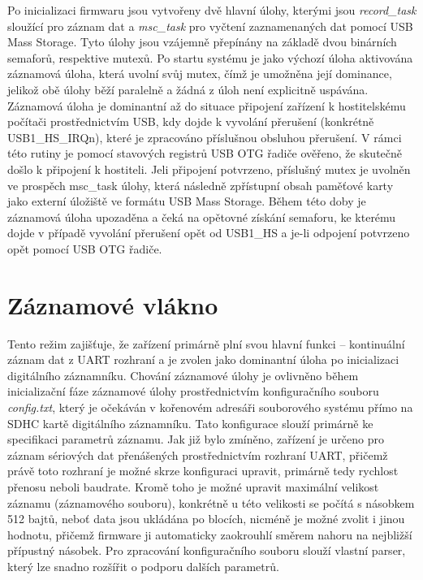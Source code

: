 Po inicializaci firmwaru jsou vytvořeny dvě hlavní úlohy, kterými jsou \textit{record\_task} sloužící pro záznam dat  a \textit{msc\_task} pro vyčtení zaznamenaných dat pomocí USB Mass Storage. Tyto úlohy jsou vzájemně přepínány na základě dvou binárních semaforů, respektive mutexů. Po startu systému je jako výchozí úloha aktivována záznamová úloha, která uvolní svůj mutex, čímž je umožněna její dominance, jelikož obě úlohy běží paralelně a žádná z úloh není explicitně uspávána. Záznamová úloha je dominantní až do situace připojení zařízení k hostitelskému počítači prostřednictvím USB, kdy dojde k vyvolání přerušení (konkrétně USB1\_HS\_IRQn), které je zpracováno příslušnou obsluhou přerušení. V rámci této rutiny je pomocí stavových registrů USB OTG řadiče ověřeno, že skutečně došlo k připojení k hostiteli. Jeli připojení potvrzeno, příslušný mutex je uvolněn ve prospěch msc\_task úlohy, která následně zpřístupní obsah paměťové karty jako externí úložiště ve formátu USB Mass Storage. Během této doby je záznamová úloha upozaděna a čeká na opětovné získání semaforu, ke kterému dojde v případě vyvolání přerušení opět od USB1\_HS a je-li odpojení potvrzeno opět pomocí USB OTG řadiče. 

\newpage

\section{Záznamové vlákno}
Tento režim zajišťuje, že zařízení primárně plní svou hlavní funkci – kontinuální záznam dat z UART rozhraní a je zvolen jako dominantní úloha po inicializaci digitálního záznamníku. Chování záznamové úlohy je ovlivněno během inicializační fáze záznamové úlohy prostřednictvím konfiguračního souboru \textit{config.txt}, který je očekáván v kořenovém adresáři souborového systému přímo na SDHC kartě digitálního záznamníku. Tato konfigurace slouží primárně ke specifikaci parametrů záznamu. Jak již bylo zmíněno, zařízení je určeno pro záznam sériových dat přenášených prostřednictvím rozhraní UART, přičemž právě toto rozhraní je možné skrze konfiguraci upravit, primárně tedy rychlost přenosu neboli baudrate. Kromě toho je možné upravit maximální velikost záznamu (záznamového souboru), konkrétně u této velikosti se počítá s násobkem 512 bajtů, neboť data jsou ukládána po blocích, nicméně je možné zvolit i jinou hodnotu, přičemž firmware ji automaticky zaokrouhlí směrem nahoru na nejbližší přípustný násobek. Pro zpracování konfiguračního souboru slouží vlastní parser, který lze snadno rozšířit o podporu dalších parametrů.


